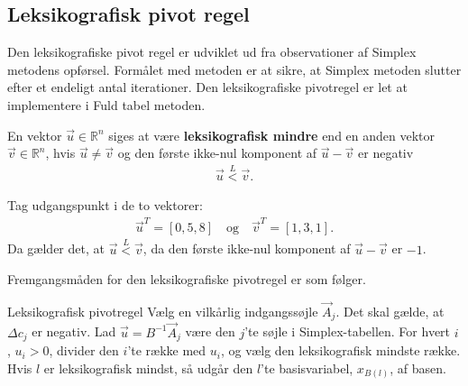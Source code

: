 \subsection{Leksikografisk pivot regel}
Den leksikografiske pivot regel er udviklet ud fra observationer af Simplex metodens opførsel. Formålet med metoden er at sikre, at Simplex metoden slutter efter et endeligt antal iterationer. Den leksikografiske pivotregel er let at implementere i Fuld tabel metoden. 
\begin{defn}
En vektor $\vec{u} \in \mathds{R}^n$ siges at være \textbf{leksikografisk mindre} end en anden vektor $\vec{v} \in \mathds{R}^n$, hvis $\vec{u} \neq \vec{v}$ og den første ikke-nul komponent af $\vec{u}-\vec{v}$ er negativ 
\begin{align*}
\vec{u} \overset{L}{<} \vec{v}.
\end{align*}
\end{defn}
\begin{eks}
Tag udgangspunkt i de to vektorer: 
\begin{align*}
\vec{u}^T=[0,5,8]\quad 
\text{og}
\quad \vec{v}^T=[1,3,1]. 
\end{align*}
Da gælder det, at $\vec{u} \overset{L}{<} \vec{v}$, da den første ikke-nul komponent af $\vec{u}-\vec{v}$ er $-1$.
\end{eks}

Fremgangsmåden for den leksikografiske pivotregel er som følger.
  
\begin{pro}{Leksikografisk pivotregel}
Vælg en vilkårlig indgangssøjle $\vec{A}_j$. Det skal gælde, at $\Delta c_j$ er negativ. Lad $\vec{u}=B^{-1}\vec{A}_j$ være den $j$'te søjle i Simplex-tabellen.
For hvert $i$, $u_i>0$, divider den $i$'te række med $u_i$, og vælg den leksikografisk mindste række. Hvis $l$ er leksikografisk mindst, så udgår den $l$'te basisvariabel, $x_{B(l)}$, af basen. 
\end{pro}

